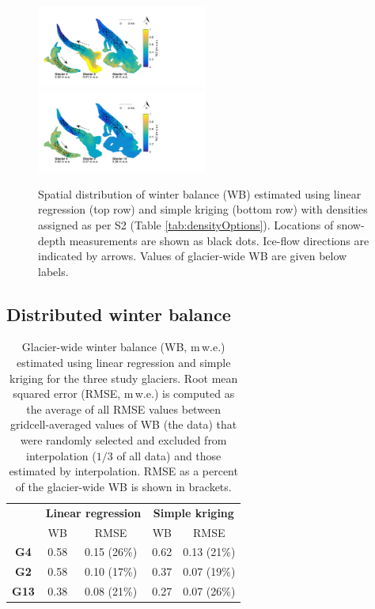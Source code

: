 \documentclass[review,oneside, letterpaper]{igs}
\begin{document}
\begin{figure}
	\centering
	\includegraphics[width =0.5\textwidth]{LR_map.pdf}\\
    \includegraphics[width =0.5\textwidth]{SK_map.pdf}\\
	\caption{Spatial distribution of winter balance (WB) estimated using linear regression (top row) and simple kriging (bottom row) with densities assigned as per S2 (Table \ref{tab:densityOptions}). Locations of snow-depth measurements are shown as black dots. Ice-flow directions are indicated by arrows. Values of glacier-wide WB are given below labels.}
	\label{fig:LR_SK_map}
\end{figure}


\subsection{Distributed winter balance}
 
 \begin{table}[]
\centering
\caption{Glacier-wide winter balance (WB, m\,w.e.) estimated using linear regression and simple kriging for the three study glaciers. Root mean squared error (RMSE, m\,w.e.) is computed as the average of all RMSE values between gridcell-averaged values of WB (the data) that were randomly selected and excluded from interpolation ($1/3$ of all data) and those estimated by interpolation. RMSE as a percent of the glacier-wide WB is shown in brackets.}
\label{tab:WSMB&RMSE}
\begin{tabular}{c|cc|cc}
 & \multicolumn{2}{c|}{\textbf{Linear regression}} & \multicolumn{2}{c}{\textbf{Simple kriging}} \\
 & WB & RMSE & WB & RMSE \\ \hline
\textbf{G4} & 0.58 & 0.15 (26\%) & 0.62 & 0.13 (21\%) \\
\textbf{G2} & 0.58 & 0.10 (17\%) & 0.37 & 0.07 (19\%) \\
\textbf{G13} & 0.38 & 0.08 (21\%) & 0.27 & 0.07 (26\%)
\end{tabular}
\end{table}
\end{document}
